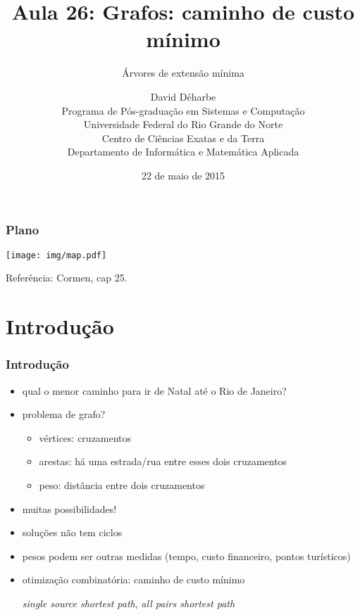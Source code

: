 \documentclass{beamer}
\title{Aula 26: Grafos: caminho de custo mínimo}
\subtitle{Árvores de extensão mínima}
\author{David Déharbe \\
  Programa de Pós-graduação em Sistemas e Computação \\
  Universidade Federal do Rio Grande do Norte \\
  Centro de Ciências Exatas e da Terra \\
  Departamento de Informática e Matemática Aplicada}
\date{22 de maio de 2015}
\begin{document}

\begin{frame}
  \titlepage
\end{frame}

\begin{frame}
  \frametitle{Plano}
\begin{center}
\texttt{[image: img/map.pdf]}
\end{center}
  \tableofcontents
Referência: Cormen, cap 25.
\end{frame}

\section{Introdução}

\begin{frame}
\frametitle{Introdução}

\begin{itemize}
\item qual o menor caminho para ir de Natal até o Rio de Janeiro?
\item problema de grafo?
\begin{itemize}
\item vértices: cruzamentos
\item arestas: há uma estrada/rua entre esses dois cruzamentos
\item peso: distância entre dois cruzamentos
\end{itemize}
\item muitas possibilidades!
\item soluções não tem ciclos
\item pesos podem ser outras medidas (tempo, custo financeiro, pontos turísticos)
\item \alert{otimização combinatória}: caminho de custo mínimo

\textit{single source shortest path},
\textit{all pairs shortest path}
\end{itemize}

\end{frame}
\end{document}
